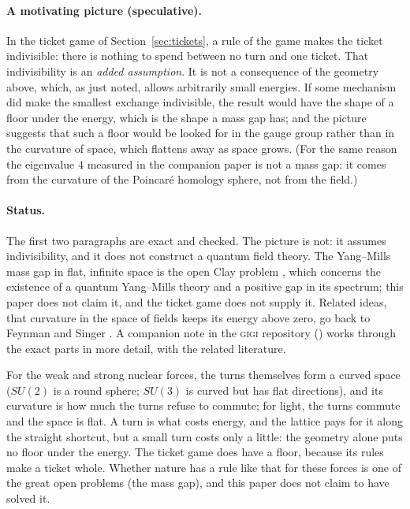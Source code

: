 \documentclass[11pt]{article}
\begin{document}
\paragraph{A motivating picture (speculative).} In the ticket game of Section~\ref{sec:tickets}, a rule of the game
makes the ticket indivisible: there is nothing to spend between no turn and one ticket. That indivisibility is an
\emph{added assumption}. It is not a consequence of the geometry above, which, as just noted, allows arbitrarily small
energies. If some mechanism did make the smallest exchange indivisible, the result would have the shape of a floor
under the energy, which is the shape a mass gap has; and the picture suggests that such a floor would be looked for in
the gauge group rather than in the curvature of space, which flattens away as space grows. (For the same reason the
eigenvalue $4$ measured in the companion paper is not a mass gap: it comes from the curvature of the Poincar\'e
homology sphere, not from the field.)

\paragraph{Status.} The first two paragraphs are exact and checked. The picture is not: it assumes indivisibility,
and it does not construct a quantum field theory. The Yang--Mills mass gap in flat, infinite space is the open Clay
problem \cite{jaffewitten}, which concerns the existence of a quantum Yang--Mills theory and a positive gap in its
spectrum; this paper does not claim it, and the ticket game does not supply it. Related ideas, that curvature in the space of fields keeps its
energy above zero, go back to Feynman \cite{feynman} and Singer \cite{singer}. A companion
note in the \textsc{gigi} repository ()
works through the exact parts in more detail, with the related literature.

\begin{plain}
For the weak and strong nuclear forces, the turns themselves form a curved space ($SU(2)$ is a round sphere;
$SU(3)$ is curved but has flat directions), and its curvature is how much the turns refuse to commute; for light,
the turns commute and the space is flat. A turn is what costs energy, and the lattice pays for it along the straight
shortcut, but a small turn costs only a little: the geometry alone puts no floor under the energy. The ticket game
does have a floor, because its rules make a ticket whole. Whether nature has a rule like that for these forces is
one of the great open problems (the mass gap), and this paper does not claim to have solved it.
\end{plain}
\end{document}
